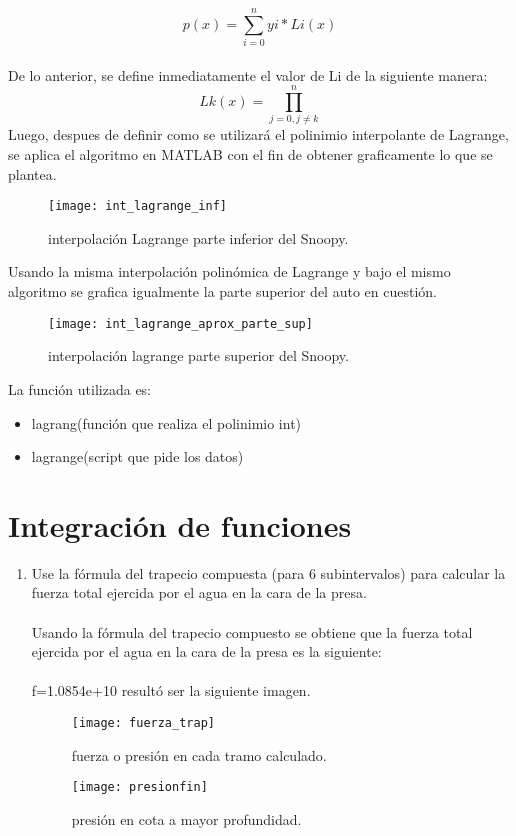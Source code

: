 \documentclass{udpreport}
\begin{document}
\begin{enumerate}
 \begin{equation}
 p(x)=\sum_{i=0}^n yi*Li(x)
\end{equation}
\\ De lo anterior, se define inmediatamente el valor de Li de la siguiente manera:
 \begin{equation}
 Lk(x)=\prod_{j=0,j\not=k}^{n}
\end{equation}
Luego, despues de definir como se utilizará el polinimio interpolante de Lagrange, se aplica el algoritmo en MATLAB con el fin de obtener graficamente lo que se plantea. 
\begin{figure}[H]
    \centering
    \texttt{[image: int\_lagrange\_inf]}
    \caption{interpolación Lagrange parte inferior del Snoopy.} \label{fig:int_lagrange_inf}
\end{figure}
Usando la misma interpolación polinómica de Lagrange y bajo el mismo algoritmo se grafica igualmente la parte superior del auto en cuestión.
\begin{figure}[H]
    \centering
    \texttt{[image: int\_lagrange\_aprox\_parte\_sup]}
    \caption{interpolación lagrange parte superior del Snoopy.} \label{fig:int_lagrange_aprox_parte_sup}
\end{figure}
La función utilizada es:
 
\begin{itemize}
\item lagrang(función que realiza el polinimio int)
\item lagrange(script que pide los datos)
\end{itemize}
\newpage


  
 \chapter{Integración de funciones} 

 \begin{enumerate}
 \item Use la fórmula del trapecio compuesta (para 6 subintervalos) para calcular la fuerza total ejercida por el agua en la cara de la presa.
 \\ 
 \\
 Usando la fórmula del trapecio compuesto se obtiene que la fuerza total ejercida por el agua en la cara de la presa es la siguiente:
 \\
 \\
 f=1.0854e+10
 resultó ser la siguiente imagen.
 \begin{figure}[H]
    \centering
    \texttt{[image: fuerza\_trap]}
    \caption{fuerza o presión en cada tramo calculado.} \label{fig:fuerza_trap}
\end{figure}
 \begin{figure}[H]
    \centering
    \texttt{[image: presionfin]}
    \caption{presión en cota a mayor profundidad.} \label{fig:presionfin}
\end{figure}


\end{enumerate}
\end{enumerate}
\end{document}
